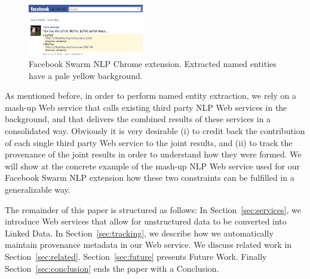 \documentclass[conference]{IEEEtran}
\begin{document}
\begin{figure}[htb!]
  \centering
    \includegraphics[width=0.45\textwidth]{facebook-swarm-nlp.png}
  \caption{Facebook Swarm NLP Chrome extension. Extracted named entities have a pale yellow background.}     
  \label{fig:facebook}
\end{figure}

As mentioned before, in order to perform named entity extraction, we rely on a mash-up Web service that calls existing third party NLP Web services in the background, and that delivers the combined results of these services in a consolidated way. Obviously it is very desirable (i) to credit back the contribution of each single third party Web service to the joint results, and (ii) to track the provenance of the joint results in order to understand how they were formed. We will show at the concrete example of the mash-up NLP Web service used for our Facebook Swarm NLP extension how these two constraints can be fulfilled in a generalizable way.

The remainder of this paper is structured as follows: In Section~\ref{sec:services}, we introduce Web services that allow for unstructured data to be converted into Linked Data. In Section~\ref{sec:tracking}, we describe how we automatically maintain provenance metadata in our Web service. We discuss related work in Section~\ref{sec:related}. Section~\ref{sec:future} presents Future Work. Finally Section~\ref{sec:conclusion} ends the paper with a Conclusion.
\end{document}
